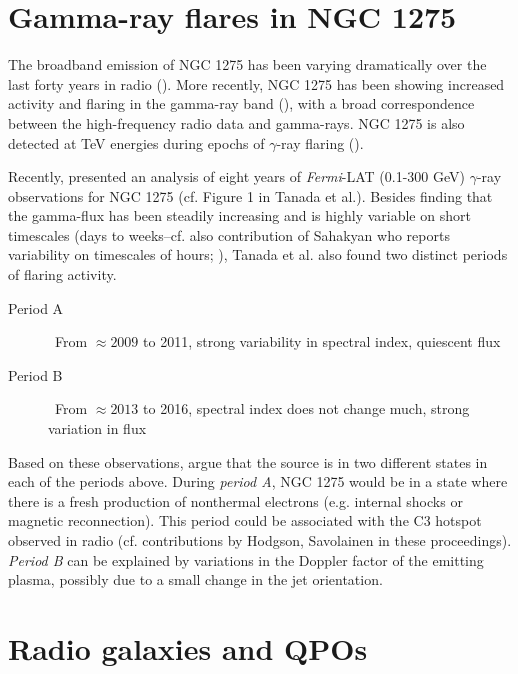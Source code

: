 \documentclass{iau}
\begin{document}
\section{Gamma-ray flares in NGC 1275}

The broadband emission of NGC 1275 has been varying dramatically over the last forty years in radio (\cite[Dutson et al. 2014]{Dutson2014}). More recently, NGC 1275 has been showing increased activity and flaring in the gamma-ray band (\cite[Tanada et al. 2018]{Tanada2018}), with a broad correspondence between the high-frequency radio data and gamma-rays. NGC 1275 is also detected at TeV energies during epochs of $\gamma$-ray flaring (\cite[Aleksic et al. 2012]{Aleksic2012}).

Recently, \cite{Tanada2018} presented an analysis of eight years of \textit{Fermi}-LAT (0.1-300 GeV) $\gamma$-ray observations for NGC 1275 (cf. Figure 1 in Tanada et al.). Besides finding that  the gamma-flux has been steadily increasing and is highly variable on short timescales (days to weeks--cf. also contribution of Sahakyan who reports variability on timescales of hours; \cite[Baghmanyan et al. 2017]{Baghmanyan2017}), Tanada et al. also found two distinct periods of flaring activity.
\begin{description}
	\item[Period A] \ From $\approx 2009$ to 2011, strong variability in spectral index, quiescent flux
	\item[Period B] \ From $\approx 2013$ to 2016, spectral index does not change much, strong variation in flux
\end{description}
Based on these observations, \cite{Tanada2018} argue that the source is in two different states in each of the periods above. During \textit{period A}, NGC 1275 would be in a state where there is a fresh production of nonthermal electrons (e.g.  internal shocks or magnetic reconnection). This period could be associated with the C3 hotspot observed in radio (cf. contributions by Hodgson, Savolainen in these proceedings). \textit{Period B} can be explained by variations in the Doppler factor of the emitting plasma, possibly due to a small change in the jet orientation.








\section{Radio galaxies and QPOs}
\end{document}
